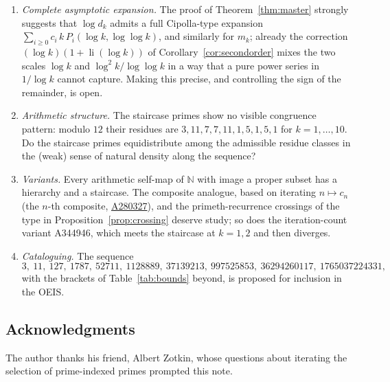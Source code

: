 \documentclass[11pt,a4paper]{article}
\theoremstyle{plain}
\theoremstyle{definition}
\newcommand{\N}{\mathbb{N}}
\newcommand{\li}{\operatorname{li}}
\begin{document}
\begin{enumerate}[leftmargin=1.6em,itemsep=2pt,topsep=4pt]
\item \emph{Complete asymptotic expansion.} The proof of
Theorem~\ref{thm:master} strongly suggests that $\log d_k$ admits a full
Cipolla-type expansion
$\sum_{i\ge0} c_i\,k\,P_i(\log k,\log\log k)$, and similarly for $m_k$;
already the correction $(\log k)(1+\li(\log k))$ of
Corollary~\ref{cor:secondorder} mixes the two scales $\log k$ and
$\log^2k/\log\log k$ in a way that a pure power series in $1/\log k$ cannot
capture. Making this precise, and controlling the sign of the remainder,
is open.
\item \emph{Arithmetic structure.} The staircase primes show no visible
congruence pattern: modulo $12$ their residues are
$3,11,7,7,11,1,5,1,5,1$ for $k=1,\ldots,10$. Do the staircase primes
equidistribute among the admissible residue classes in the (weak) sense of
natural density along the sequence?
\item \emph{Variants.} Every arithmetic self-map of $\N$ with image a
proper subset has a hierarchy and a staircase. The composite analogue,
based on iterating $n\mapsto c_n$ (the $n$-th composite,
\href{https://oeis.org/A280327}{A280327}), and the primeth-recurrence
crossings of the type in Proposition~\ref{prop:crossing} deserve study; so
does the iteration-count variant A344946, which meets the staircase at
$k=1,2$ and then diverges.
\item \emph{Cataloguing.} The sequence
\[
  3,\ 11,\ 127,\ 1787,\ 52711,\ 1128889,\ 37139213,\ 997525853,\
  36294260117,\ 1765037224331,
\]
with the brackets of Table~\ref{tab:bounds} beyond, is
proposed for inclusion in the OEIS.
\end{enumerate}

\subsection*{Acknowledgments}
The author thanks his friend, Albert Zotkin, whose questions about iterating the selection
of prime-indexed primes prompted this note.
\end{document}
